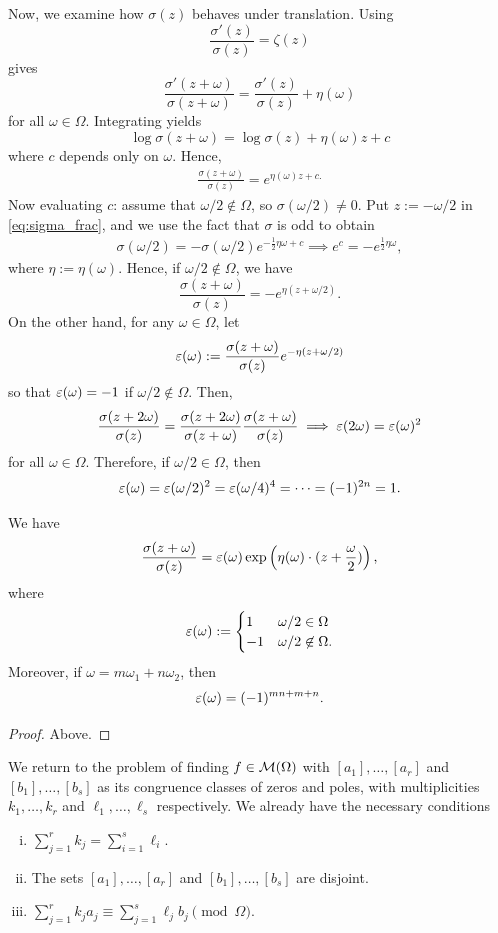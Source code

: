 \documentclass[11pt]{article}
\begin{document}
Now, we examine how $\sigma(z)$ behaves under translation. Using
$$\frac{\sigma'(z)}{\sigma(z)}=\zeta(z)$$
gives
$$\frac{\sigma'(z+\omega)}{\sigma(z+\omega)} = \frac{\sigma'(z)}{\sigma(z)} +\eta(\omega)$$
for all $\omega \in \Omega$. Integrating yields 
$$\log \sigma(z+\omega) = \log \sigma(z) + \eta(\omega)z  +c$$
where $c$ depends only on $\omega$. Hence,
\begin{align} \label{eq:sigma_frac}
    \frac{\sigma(z+\omega)}{\sigma(z)}=e^{\eta(\omega)z + c.}
\end{align}
Now evaluating $c$: assume that $\omega/2 \not \in \Omega$, so $\sigma(\omega/2) \neq 0$. Put $z:= -\omega/2$ in \eqref{eq:sigma_frac}, and we use the fact that $\sigma$ is odd to obtain
\begin{align*}
    \sigma(\omega/2) = -\sigma(\omega/2)e^{-\frac{1}{2}\eta\omega + c}\implies e^c = -e^{\frac{1}{2}\eta\omega},
\end{align*}
where $\eta:= \eta(\omega)$. Hence, if $\omega/2 \not \in \Omega$, we have
$$\frac{\sigma(z+\omega)}{\sigma(z)}=-e^{\eta (z+\omega/2)}.$$
On the other hand, for any $\omega \in \Omega$, let
$$\varepsilon (\omega):= \frac{\sigma(z+\omega)}{\sigma(z)}e^{-\eta(z+\omega/2)}$$
so that $\varepsilon(\omega)=-1$ if $\omega/2 \not \in \Omega$. Then,
\begin{align*}
    \frac{\sigma(z+2\omega)}{\sigma(z)}=\frac{\sigma(z+2\omega)}{\sigma (z+\omega)}\frac{\sigma(z+\omega)}{\sigma(z)} \implies \varepsilon(2\omega) = \varepsilon(\omega)^2
\end{align*}
for all $\omega \in \Omega$. Therefore, if $\omega/2 \in \Omega$, then
$$\varepsilon(\omega) = \varepsilon(\omega/2)^2 =\varepsilon(\omega/4)^4 = \cdots = (-1)^{2n}=1.$$

\begin{thm}
    We have
    \begin{align*}
        \frac{\sigma(z+\omega)}{\sigma(z)}=\varepsilon(\omega) \exp\left ( \eta (\omega)\cdot (z+\frac{\omega}{2}) \right ),
    \end{align*}
    where
    $$\varepsilon(\omega) := \begin{cases}1 & \omega/2 \in \Omega \\ -1 & \omega/2 \not \in \Omega.\end{cases}$$
    Moreover, if $\omega = m\omega_1 + n\omega_2$, then
    $$\varepsilon(\omega ) = (-1)^{mn+m+n}.$$
\end{thm}

\begin{proof}
    Above.
\end{proof}

We return to the problem of finding $f \in \mathcal M(\Omega)$ with $[a_1],\dots,[a_r]$ and $[b_1],\dots,[b_s]$ as its congruence classes of zeros and poles, with multiplicities $k_1,\dots,k_r$ and $\ell_1,\dots,\ell_s$ respectively.  We already have the necessary conditions 
\begin{enumerate}[(i)]
    \item $\sum_{j=1}^r k_j = \sum_{i=1}^s \ell_i$.
    \item The sets $[a_1],\dots,[a_r]$ and $[b_1],\dots, [b_s]$ are disjoint.
    \item $\sum_{j=1}^rk_ja_j \equiv \sum_{j=1}^s \ell_jb_j \pmod \Omega$.
\end{enumerate}
\end{document}
